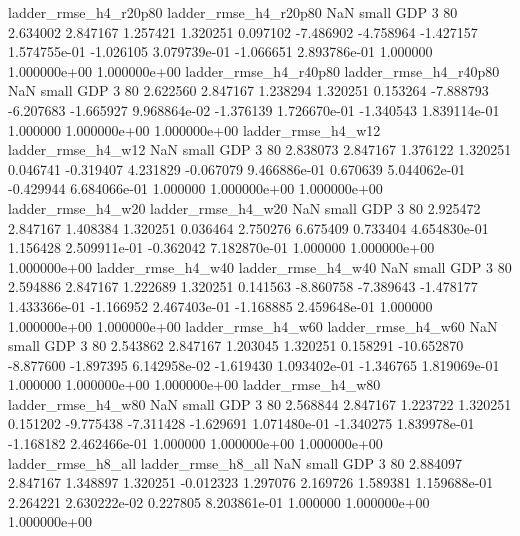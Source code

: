    ladder_rmse_h4_r20p80    ladder_rmse_h4_r20p80                   NaN      small      GDP                 3 80 2.634002       2.847167 1.257421       1.320251    0.097102     -7.486902     -4.758964    -1.427157   1.574755e-01 -1.026105 3.079739e-01    -1.066651   2.893786e-01            1.000000    1.000000e+00        1.000000e+00
   ladder_rmse_h4_r40p80    ladder_rmse_h4_r40p80                   NaN      small      GDP                 3 80 2.622560       2.847167 1.238294       1.320251    0.153264     -7.888793     -6.207683    -1.665927   9.968864e-02 -1.376139 1.726670e-01    -1.340543   1.839114e-01            1.000000    1.000000e+00        1.000000e+00
      ladder_rmse_h4_w12       ladder_rmse_h4_w12                   NaN      small      GDP                 3 80 2.838073       2.847167 1.376122       1.320251    0.046741     -0.319407      4.231829    -0.067079   9.466886e-01  0.670639 5.044062e-01    -0.429944   6.684066e-01            1.000000    1.000000e+00        1.000000e+00
      ladder_rmse_h4_w20       ladder_rmse_h4_w20                   NaN      small      GDP                 3 80 2.925472       2.847167 1.408384       1.320251    0.036464      2.750276      6.675409     0.733404   4.654830e-01  1.156428 2.509911e-01    -0.362042   7.182870e-01            1.000000    1.000000e+00        1.000000e+00
      ladder_rmse_h4_w40       ladder_rmse_h4_w40                   NaN      small      GDP                 3 80 2.594886       2.847167 1.222689       1.320251    0.141563     -8.860758     -7.389643    -1.478177   1.433366e-01 -1.166952 2.467403e-01    -1.168885   2.459648e-01            1.000000    1.000000e+00        1.000000e+00
      ladder_rmse_h4_w60       ladder_rmse_h4_w60                   NaN      small      GDP                 3 80 2.543862       2.847167 1.203045       1.320251    0.158291    -10.652870     -8.877600    -1.897395   6.142958e-02 -1.619430 1.093402e-01    -1.346765   1.819069e-01            1.000000    1.000000e+00        1.000000e+00
      ladder_rmse_h4_w80       ladder_rmse_h4_w80                   NaN      small      GDP                 3 80 2.568844       2.847167 1.223722       1.320251    0.151202     -9.775438     -7.311428    -1.629691   1.071480e-01 -1.340275 1.839978e-01    -1.168182   2.462466e-01            1.000000    1.000000e+00        1.000000e+00
      ladder_rmse_h8_all       ladder_rmse_h8_all                   NaN      small      GDP                 3 80 2.884097       2.847167 1.348897       1.320251   -0.012323      1.297076      2.169726     1.589381   1.159688e-01  2.264221 2.630222e-02     0.227805   8.203861e-01            1.000000    1.000000e+00        1.000000e+00
